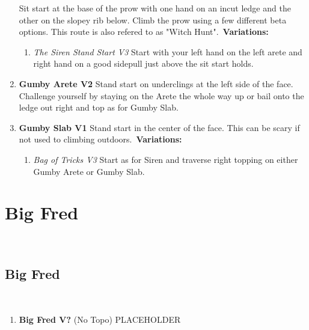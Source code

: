 \begin{enumerate}[]
	\newline Sit start at the base of the prow with one hand on an incut ledge and the other on the slopey rib below. Climb the prow using a few different beta options. This route is also refered to as "Witch Hunt".\
	\newline \textbf{Variations:}
	\begin{enumerate}
		\item\label{vr:The Siren Stand Start} \colorbox{green!20}{\emph{The Siren Stand Start V3    }  }
		\newline Start with your left hand on the left arete and right hand on a good sidepull just above the sit start holds.\
	\end{enumerate}
	\setcounter{enumi}{17}
	\item\label{rt:Gumby Arete} \colorbox{green!20}{\textbf{Gumby Arete V2    } }
	\newline Stand start on underclings at the left side of the face. Challenge yourself by staying on the Arete the whole way up or bail onto the ledge out right and top as for Gumby Slab.\
	\setcounter{enumi}{18}
	\item\label{rt:Gumby Slab} \colorbox{green!20}{\textbf{Gumby Slab V1   \ding{72}  } }
	\newline Stand start in the center of the face. This can be scary if not used to climbing outdoors.\
	\newline \textbf{Variations:}
	\begin{enumerate}
		\item\label{vr:Bag of Tricks} \colorbox{green!20}{\emph{Bag of Tricks V3 \ding{72}  }  }
		\newline Start as for Siren and traverse right topping on either Gumby Arete or Gumby Slab.\
	\end{enumerate}
\end{enumerate}
\section{Big Fred}\label{sa:Big Fred}
\
\subsection*{Big Fred}\label{bf:Big Fred}
\

\begin{enumerate}[]
	\setcounter{enumi}{0}
	\item\label{rt:Big Fred} \colorbox{black!20}{\textbf{Big Fred V?  } }
	\newline (No Topo) 
	\newline PLACEHOLDER\
\end{enumerate}

